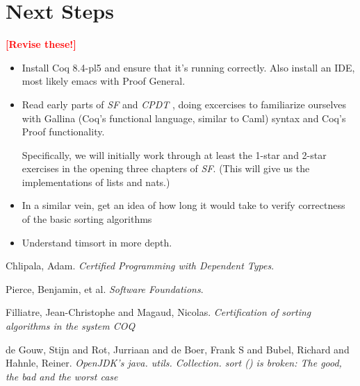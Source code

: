 \documentclass{article}
\newcommand{\todo}[1]{\textcolor{red}{\textbf{\textsf{[#1]}}}}
\begin{document}
\section{Next Steps}
\todo{Revise these!}
\begin{itemize}
  \item
    Install Coq 8.4-pl5 and ensure that it's running correctly.
    Also install an IDE, most likely emacs with Proof General.
  \item
    Read early parts of \emph{SF} \cite{sf} and \emph{CPDT} \cite{cpdt},
    doing excercises to familiarize ourselves with Gallina (Coq's functional
    language, similar to Caml) syntax and Coq's Proof functionality.

    Specifically, we will initially work through at least the 1-star and
    2-star exercises in the opening three chapters of \emph{SF}.
    (This will give us the implementations of lists and nats.)

  \item
    In a similar vein, get an idea of how long it would take to
    verify correctness of the basic sorting algorithms

  \item
    Understand timsort in more depth.
\end{itemize}

\begin{thebibliography}{xx}
    Chlipala, Adam. \emph{Certified Programming with Dependent Types}.

    Pierce, Benjamin, et al. \emph{Software Foundations}.

    Filliatre, Jean-Christophe and Magaud, Nicolas. \emph{Certification of
    sorting algorithms in the system COQ}

    de Gouw, Stijn and Rot, Jurriaan and de Boer, Frank S and Bubel, Richard
    and Hahnle, Reiner. \emph{OpenJDK's java. utils. Collection. sort () is
    broken: The good, the bad and the worst case}
\end{thebibliography}
\end{document}
